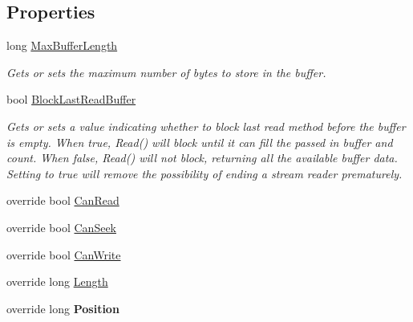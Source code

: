 \subsection*{Properties}
\begin{DoxyCompactItemize}
\item 
long \mbox{\hyperlink{class_a_d_l_1_1_pipe_stream_a250f42c7da667f60487068e27c3d67d0}{Max\+Buffer\+Length}}
\begin{DoxyCompactList}\small\item\em Gets or sets the maximum number of bytes to store in the buffer. \end{DoxyCompactList}\item 
bool \mbox{\hyperlink{class_a_d_l_1_1_pipe_stream_af05e530e849bfee481290e8139f27379}{Block\+Last\+Read\+Buffer}}
\begin{DoxyCompactList}\small\item\em Gets or sets a value indicating whether to block last read method before the buffer is empty. When true, Read() will block until it can fill the passed in buffer and count. When false, Read() will not block, returning all the available buffer data. Setting to true will remove the possibility of ending a stream reader prematurely. \end{DoxyCompactList}\item 
override bool \mbox{\hyperlink{class_a_d_l_1_1_pipe_stream_a194eae1c5b19a0999a5d12bcef00efd9}{Can\+Read}}
\item 
override bool \mbox{\hyperlink{class_a_d_l_1_1_pipe_stream_ad891fa332a41aeb44026c5a89ddc36e8}{Can\+Seek}}
\item 
override bool \mbox{\hyperlink{class_a_d_l_1_1_pipe_stream_a24b173b85db2cb2c76c8688086e6aebb}{Can\+Write}}
\item 
override long \mbox{\hyperlink{class_a_d_l_1_1_pipe_stream_a4c9f83e98008f203c5535ad730ca0614}{Length}}
\item 
\mbox{\label{class_a_d_l_1_1_pipe_stream_ae0cdcae01baf4b9cab2e947e1e38e284}} 
override long {\bfseries Position}
\end{DoxyCompactItemize}
